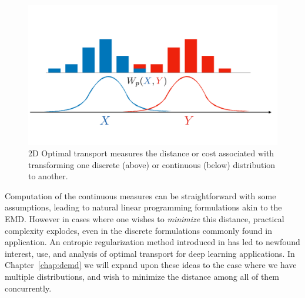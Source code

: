 \begin{figure}
	\centering
	\includegraphics[width=\textwidth,trim={0 5cm 0 10cm},clip]{2_bknd/ot.pdf}
	\caption[Distributions and optimal transport]{2D Optimal transport measures the distance or cost associated with transforming one discrete (above) or continuous (below) distribution to another.}
	\label{fig:bkndot}
\end{figure}
Computation of the continuous measures can be straightforward with some assumptions,
leading to natural linear programming formulations akin to the EMD.
However in cases where one wishes to \textit{minimize} this distance,
practical complexity explodes, even in the discrete
formulations commonly found in application.
An entropic regularization method introduced in \cite{cuturi2013sinkhorn}
has led to newfound interest,
use, and analysis of optimal transport for deep learning applications.
In Chapter~\ref{chap:demd} we will expand upon these
ideas to the case where we have multiple distributions,
and wish to minimize the distance among all of them concurrently.
